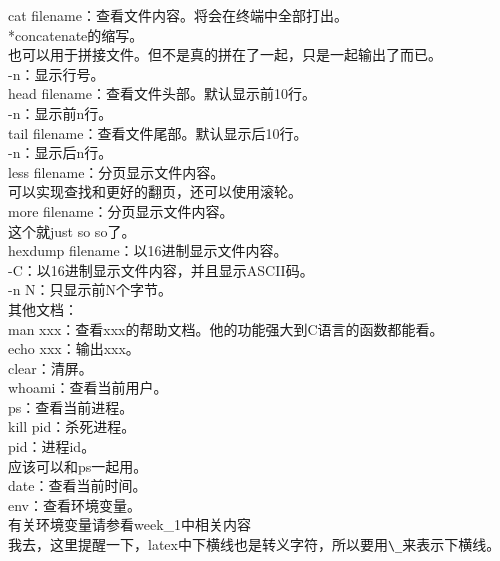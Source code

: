 \documentclass{article}
\begin{document}
\noindent
cat filename：查看文件内容。将会在终端中全部打出。\\
\hspace*{2em} *concatenate的缩写。\\
\hspace*{2em} 也可以用于拼接文件。但不是真的拼在了一起，只是一起输出了而已。\\
\hspace*{2em} -n：显示行号。\\

\noindent
head filename：查看文件头部。默认显示前10行。\\
\hspace*{2em} -n：显示前n行。\\

\noindent
tail filename：查看文件尾部。默认显示后10行。\\
\hspace*{2em} -n：显示后n行。\\

\noindent
less filename：分页显示文件内容。\\
\hspace*{2em} 可以实现查找和更好的翻页，还可以使用滚轮。\\

\noindent
more filename：分页显示文件内容。\\
\hspace*{2em} 这个就just so so了。\\

\noindent
hexdump filename：以16进制显示文件内容。\\
\hspace*{2em} -C：以16进制显示文件内容，并且显示ASCII码。\\
\hspace*{2em} -n N：只显示前N个字节。\\

\noindent
其他文档：\\
man xxx：查看xxx的帮助文档。他的功能强大到C语言的函数都能看。\\
echo xxx：输出xxx。\\

\noindent
clear：清屏。\\
whoami：查看当前用户。\\
ps：查看当前进程。\\
kill pid：杀死进程。\\
\hspace*{2em} pid：进程id。\\
\hspace*{2em} 应该可以和ps一起用。\\
date：查看当前时间。\\
env：查看环境变量。\\
\hspace*{2em} 有关环境变量请参看week\_1中相关内容\\
\hspace*{2em} 我去，这里提醒一下，latex中下横线也是转义字符，所以要用\verb|\_|来表示下横线。\\
\end{document}
